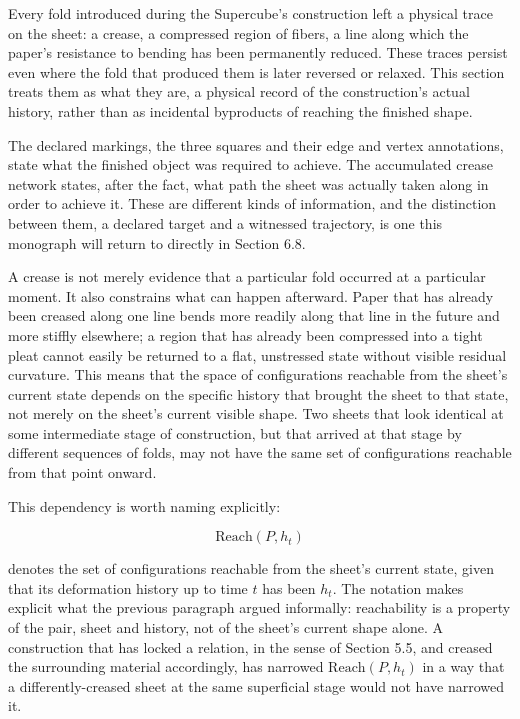 \documentclass[11pt,oneside]{book}
\begin{document}
Every fold introduced during the Supercube's construction left a
physical trace on the sheet: a crease, a compressed region of fibers, a
line along which the paper's resistance to bending has been permanently
reduced. These traces persist even where the fold that produced them is
later reversed or relaxed. This section treats them as what they are, a
physical record of the construction's actual history, rather than as
incidental byproducts of reaching the finished shape.

The declared markings, the three squares and their edge and vertex
annotations, state what the finished object was required to achieve. The
accumulated crease network states, after the fact, what path the sheet
was actually taken along in order to achieve it. These are different
kinds of information, and the distinction between them, a declared
target and a witnessed trajectory, is one this monograph will return to
directly in Section 6.8.

A crease is not merely evidence that a particular fold occurred at a
particular moment. It also constrains what can happen afterward. Paper
that has already been creased along one line bends more readily along
that line in the future and more stiffly elsewhere; a region that has
already been compressed into a tight pleat cannot easily be returned to
a flat, unstressed state without visible residual curvature. This means
that the space of configurations reachable from the sheet's current
state depends on the specific history that brought the sheet to that
state, not merely on the sheet's current visible shape. Two sheets that
look identical at some intermediate stage of construction, but that
arrived at that stage by different sequences of folds, may not have the
same set of configurations reachable from that point onward.

This dependency is worth naming explicitly:

\[\text{Reach}(P, h_t)\]

denotes the set of configurations reachable from the sheet's current
state, given that its deformation history up to time \(t\) has been
\(h_t\). The notation makes explicit what the previous paragraph argued
informally: reachability is a property of the pair, sheet and history,
not of the sheet's current shape alone. A construction that has locked a
relation, in the sense of Section 5.5, and creased the surrounding
material accordingly, has narrowed \(\text{Reach}(P, h_t)\) in a way
that a differently-creased sheet at the same superficial stage would not
have narrowed it.
\end{document}
